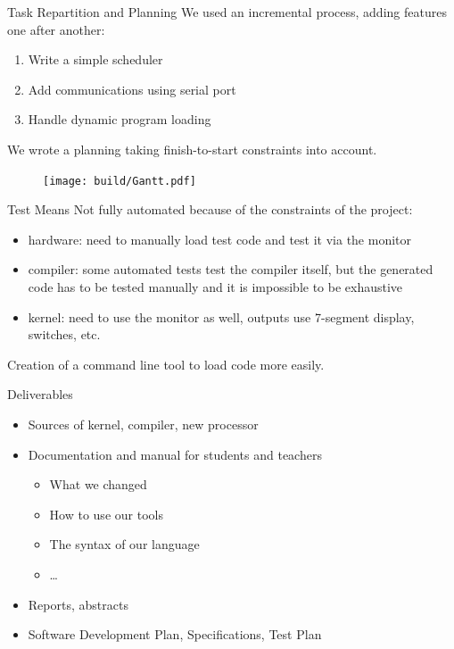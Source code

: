 \documentclass{beamer}
\begin{document}
      \begin{frame}{Task Repartition and Planning}
          We used an incremental process, adding features one after another:%
          \begin{enumerate}
            \item Write a simple scheduler
            \item Add communications using serial port
            \item Handle dynamic program loading
          \end{enumerate}

          We wrote a planning taking finish-to-start constraints into account.
      \end{frame}

      \begin{frame}[plain]
        \begin{figure}
          \texttt{[image: build/Gantt.pdf]}
        \end{figure}
      \end{frame}

      \begin{frame}{Test Means}
        Not fully automated because of the constraints of the project:
        \begin{itemize}
          \item hardware: need to manually load test code and test it via the
            monitor
          \item compiler: some automated tests test the compiler itself, but the
            generated code has to be tested manually and it is impossible to be
            exhaustive
          \item kernel: need to use the monitor as well, outputs use 7-segment
            display, switches, etc.
        \end{itemize}

        Creation of a command line tool to load code more easily.
      \end{frame}

      \begin{frame}{Deliverables}
        \begin{itemize}
          \item Sources of kernel, compiler, new processor
          \item Documentation and manual for students and teachers
            \begin{itemize}
              \item What we changed
              \item How to use our tools
              \item The syntax of our language
              \item \dots
            \end{itemize}
          \item Reports, abstracts
          \item Software Development Plan, Specifications, Test Plan
        \end{itemize}
      \end{frame}
\end{document}
